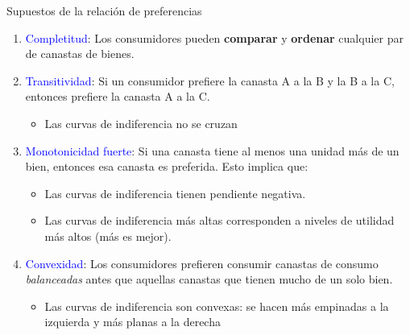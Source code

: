 \documentclass{beamer}
\begin{document}
\begin{frame}{Supuestos de la relación de preferencias}
    \begin{enumerate}
    \item \textcolor{blue}{Completitud}: Los consumidores pueden \textbf{comparar} y \textbf{ordenar} cualquier par de canastas de bienes.
    \item \textcolor{blue}{Transitividad}: Si un consumidor prefiere la canasta A a la B y la B a la C, entonces prefiere la canasta A a la C.
        \begin{itemize}
            \item Las curvas de indiferencia no se cruzan \pause
        \end{itemize}
    \item \textcolor{blue}{Monotonicidad fuerte}: Si una canasta tiene al menos una unidad más de un bien, entonces esa canasta es preferida. Esto implica que:
        \begin{itemize}
            \item Las curvas de indiferencia tienen pendiente negativa. 
            \item Las curvas de indiferencia más altas corresponden a niveles de utilidad más altos (más es mejor).
        \end{itemize}
    
    \item \textcolor{blue}{Convexidad}: Los consumidores prefieren consumir canastas de consumo \textit{balanceadas} antes que aquellas canastas que tienen mucho de un solo bien.
        \begin{itemize}
            \item Las curvas de indiferencia son convexas: se hacen más empinadas a la izquierda y más planas a la derecha 
        \end{itemize}
    \end{enumerate} 
\end{frame}
\end{document}
